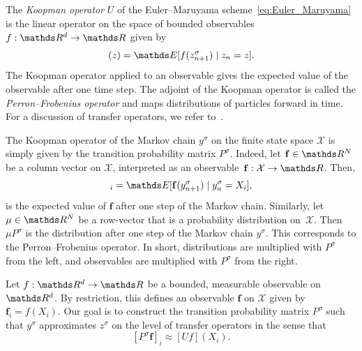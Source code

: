 The \emph{Koopman operator} $U$ of the Euler--Maruyama scheme~\eqref{eq:Euler_Maruyama} is the linear operator on the space of bounded observables $f:\R^d \to \R$ given by
\begin{equation}
    [U f] (z) = \E[f(z_{n+1}^\sigma ) \mid z_n = z].
\end{equation}
The Koopman operator applied to an observable gives the expected value of the observable after one time step. The adjoint of the Koopman operator is called the \emph{Perron--Frobenius operator} and maps distributions of particles forward in time. For a discussion of transfer operators, we refer to~\textcite{lasotaChaosFractalsNoise1994}.

The Koopman operator of the Markov chain $y^\sigma$ on the finite state space $\mathcal{X}$ is simply given by the transition probability matrix $P^\sigma$. Indeed, let $\mathbf{f}\in \R^N$ be a column vector on $\mathcal{X}$, interpreted as an observable~$\mathbf{f}:\mathcal{X} \to \R$. Then,
\begin{equation*}
    [P^\sigma \mathbf{f}]_i = \E[\mathbf{f}(y_{n+1}^\sigma) \mid y_n^\sigma = X_i],
\end{equation*}
is the expected value of $\mathbf{f}$ after one step of the Markov chain.
Similarly, let $\mu \in \R^N$ be a row-vector that is a probability distribution on~$\mathcal{X}$. Then $\mu P^\sigma$ is the distribution after one step of the Markov chain $y^\sigma$. This corresponds to the Perron--Frobenius operator. In short, distributions are multiplied with $P^{\sigma}$ from the left, and observables are multiplied with $P^{\sigma}$ from the right.

Let $f:\R^d \to \R$ be a bounded, measurable observable on $\R^d$. By restriction, this defines an observable $\mathbf{f}$ on $\mathcal{X}$ given by $\mathbf{f}_i=f(X_i)$. Our goal is to construct the transition probability matrix $P^\sigma$ such that $y^\sigma$ approximates $z^\sigma$  on the level of transfer operators in the sense that
\begin{equation}\label{eq:Koopman_equiv_first}
    [P^\sigma \mathbf{f}]_i \approx [U f](X_i).
\end{equation}

